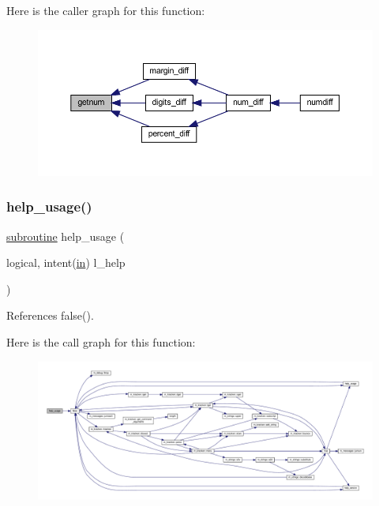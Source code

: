 Here is the caller graph for this function\+:
\nopagebreak
\begin{figure}[H]
\begin{center}
\leavevmode
\includegraphics[width=350pt]{numdiff_8f90_aaeae7de323a14e4d927224585b530d90_icgraph}
\end{center}
\end{figure}
\mbox{\label{numdiff_8f90_a3e09a3b52ee8fb04eeb93fe5761626a8}} 
\subsubsection{\texorpdfstring{help\+\_\+usage()}{help\_usage()}}
{\footnotesize\ttfamily \hyperlink{M__stopwatch_83_8txt_acfbcff50169d691ff02d4a123ed70482}{subroutine} help\+\_\+usage (\begin{DoxyParamCaption}\item[{logical, intent(\hyperlink{M__journal_83_8txt_afce72651d1eed785a2132bee863b2f38}{in})}]{l\+\_\+help }\end{DoxyParamCaption})}



References false().

Here is the call graph for this function\+:
\nopagebreak
\begin{figure}[H]
\begin{center}
\leavevmode
\includegraphics[width=350pt]{numdiff_8f90_a3e09a3b52ee8fb04eeb93fe5761626a8_cgraph}
\end{center}
\end{figure}
\mbox{\label{numdiff_8f90_a39c21619b08a3c22f19e2306efd7f766}} 
